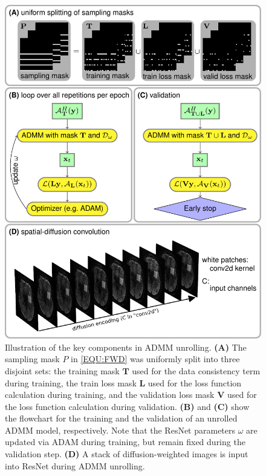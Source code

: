 \documentclass[AMA,STIX2COL,Linenumberson]{MRM}
\begin{document}
\begin{figure}
	\centering
	\includegraphics[width=\columnwidth]{./figures/fig2.png}
	\caption{Illustration of the key components in ADMM unrolling.
		\textbf{(A)} The sampling mask $P$ in \cref{EQU:FWD} was
		uniformly split into three disjoint sets:
		the training mask $\mathbf{T}$ used for
		the data consistency term during training,
		the train loss mask $\mathbf{L}$ used for
		the loss function calculation during training, and
		the validation loss mask $\mathbf{V}$ used for
		the loss function calculation during validation.
		\textbf{(B)} and \textbf{(C)} show the flowchart
		for the training and the validation of an unrolled ADMM model, respectively.
		Note that the ResNet parameters $\omega$ are updated
		via ADAM \cite{kingma_2015_adam} during training,
		but remain fixed during the validation step.
		\textbf{(D)} A stack of diffusion-weighted images
		is input into ResNet during ADMM unrolling.}
	\label{FIG:ZSSSL}
\end{figure}
\end{document}
